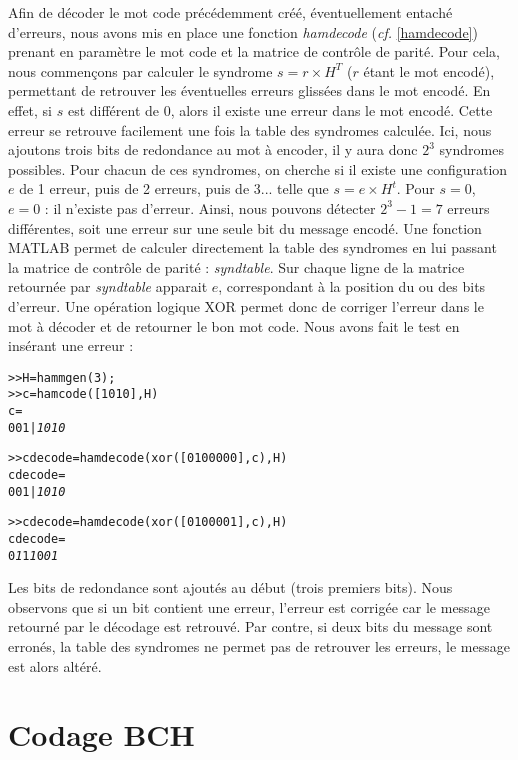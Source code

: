 \documentclass[a4paper, 12pt]{article}
\begin{document}
Afin de décoder le mot code précédemment créé, éventuellement entaché d'erreurs, nous avons mis en place une fonction \textit{hamdecode} (\textit{cf.} \ref{hamdecode}) prenant en paramètre le mot code et la matrice de contrôle de parité.
Pour cela, nous commençons par calculer le syndrome $s = r\times H^T$ ($r$ étant le mot encodé), permettant de retrouver les éventuelles erreurs glissées dans le mot encodé. En effet, si $s$ est différent de 0, alors il existe une erreur dans le mot encodé. Cette erreur se retrouve facilement une fois la table des syndromes calculée.
Ici, nous ajoutons trois bits de redondance au mot à encoder, il y aura donc $2^3$ syndromes possibles. Pour chacun de ces syndromes, on cherche si il existe une configuration $e$ de 1 erreur, puis de 2 erreurs, puis de 3... telle que $s = e \times H^t$. Pour $s=0$, $e=0$ : il n'existe pas d'erreur. Ainsi, nous pouvons détecter $2^3 - 1 = 7$ erreurs différentes, soit une erreur sur une seule bit du message encodé. Une fonction MATLAB permet de calculer directement la table des syndromes en lui passant la matrice de contrôle de parité : \textit{syndtable}. Sur chaque ligne de la matrice retournée par \textit{syndtable} apparait $e$, correspondant à la position du ou des bits d'erreur. Une opération logique XOR permet donc de corriger l'erreur dans le mot à décoder et de retourner le bon mot code. Nous avons fait le test en insérant une erreur :
\begin{alltt}
>> H = hammgen(3); % creation de la matrice de controle de parite
>> c = hamcode([1 0 1 0], H) % encodage du mot 0101
c =
     0     0     1   |   \textit{1     0     1     0}
		
% decodage avec inclusion d'une erreur
>> cdecode = hamdecode( xor([0 1 0 0 0 0 0], c), H)
cdecode =
     0     0     1   |   \textit{1     0     1     0}
		
% decodage avec inclusion de deux erreurs (limites)
>> cdecode = hamdecode( xor([0 1 0 0 0 0 1], c), H)
cdecode =
     0     \textit{1 }    1     \textit{1}     0     \textit{0     1}
\end{alltt}

Les bits de redondance sont ajoutés au début (trois premiers bits). Nous observons que si un bit contient une erreur, l'erreur est corrigée car le message retourné par le décodage est retrouvé. Par contre, si deux bits du message sont erronés, la table des syndromes ne permet pas de retrouver les erreurs, le message est alors altéré.

\section{Codage BCH}
\end{document}
